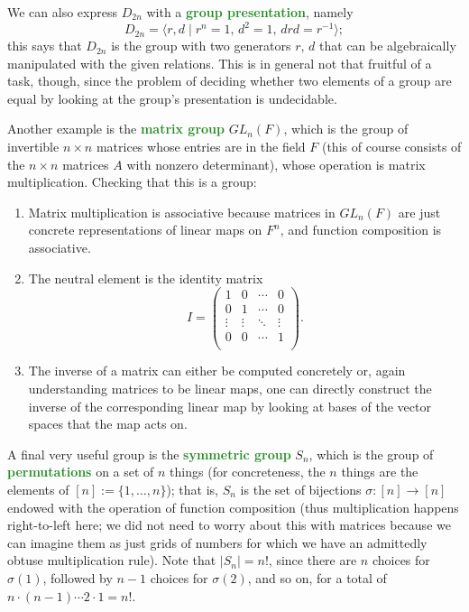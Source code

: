 \documentclass[11pt]{scrartcl}
\providecommand{\ii}{\item}
\providecommand{\inv}{^{-1}}
\providecommand{\vocab}[1]{{\textbf{\textcolor{ForestGreen}{#1}}}}
\begin{document}
We can also express $D_{2n}$ with a \vocab{group presentation}, namely
\begin{equation*}
    D_{2n} = \langle r,d \mid r^n = 1,\, d^2 = 1,\, drd = r\inv\rangle;
\end{equation*}
this says that $D_{2n}$ is the group with two generators $r$, $d$
that can be algebraically manipulated with the given relations.
This is in general not that fruitful of a task, though,
since the problem of deciding whether two elements of a group are equal
by looking at the group's presentation is undecidable.

Another example is the \vocab{matrix group} $GL_n(F)$,
which is the group of invertible $n\times n$ matrices
whose entries are in the field $F$ (this of course consists of
the $n\times n$ matrices $A$ with nonzero determinant),
whose operation is matrix multiplication. Checking that this is a group:
\begin{enumerate}[(1)]
    \ii Matrix multiplication is associative because
    matrices in $GL_n(F)$ are just concrete representations
    of linear maps on $F^n$, and function composition is associative.
    \ii The neutral element is the identity matrix
    \begin{equation*}
        I = \begin{pmatrix}
	    1&0&\cdots&0\\
	    0&1&\cdots&0\\
	    \vdots&\vdots&\ddots&\vdots\\
	    0&0&\cdots&1\\
        \end{pmatrix}.
    \end{equation*}
    \ii The inverse of a matrix can either be computed concretely
    or, again understanding matrices to be linear maps,
    one can directly construct the inverse of the corresponding linear map
    by looking at bases of the vector spaces that the map acts on.
\end{enumerate}

A final very useful group is the \vocab{symmetric group} $S_n$,
which is the group of \vocab{permutations} on a set of $n$ things
(for concreteness, the $n$ things are the elements of $[n] := \{1,\dots,n\}$);
that is, $S_n$ is the set of bijections $\sigma\colon[n]\to[n]$
endowed with the operation of function composition
(thus multiplication happens right-to-left here;
we did not need to worry about this with matrices because
we can imagine them as just grids of numbers
for which we have an admittedly obtuse multiplication rule).
Note that $|S_n| = n!$, since there are $n$ choices for $\sigma(1)$,
followed by $n-1$ choices for $\sigma(2)$, and so on,
for a total of $n\cdot(n-1)\cdots2\cdot 1 = n!$.
\end{document}
